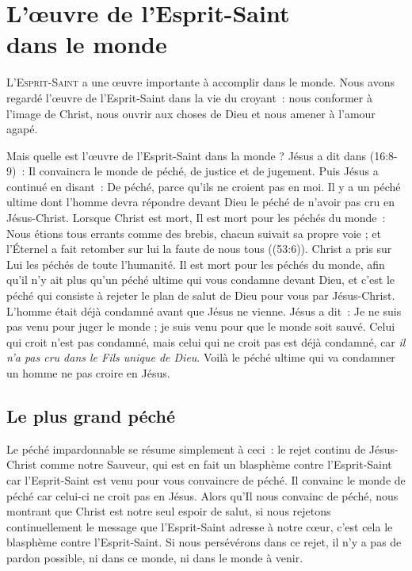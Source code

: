 \chapter[L'\oe{}uvre de l'Esprit-Saint dans le monde]{L'\oe{}uvre de l'Esprit-Saint\\ dans le monde}

\lettrine{L}{'Esprit-Saint} a une œuvre importante
 à accomplir dans le monde.
 Nous avons regardé l'œuvre de l'Esprit-Saint dans la vie du croyant~:
 nous conformer à l'image de Christ, nous ouvrir aux choses de Dieu
 et nous amener à l'amour agapé.

Mais quelle est l'œuvre de l'Esprit-Saint dans la monde ?
 Jésus a dit dans (16:8-9)~:
 \og Il convaincra le monde de péché, de justice et de jugement. \fg{}
 Puis Jésus a continué en disant~:
 \og De péché, parce qu'ils ne croient pas en moi. \fg{}
 Il y a un péché ultime dont l'homme devra répondre devant Dieu
 \ocadr le péché de n'avoir pas cru en Jésus-Christ.
 Lorsque Christ est mort, Il est mort pour les péchés du monde~:
 \og Nous étions tous errants comme des brebis,
 chacun suivait sa propre voie ;
 et l'Éternel a fait retomber sur lui la faute de nous tous \fg{}
 ((53:6)).
 Christ a pris sur Lui les péchés de toute l'humanité.
 Il est mort pour les péchés du monde, afin qu'il n'y ait plus qu'un péché
 ultime qui vous condamne devant Dieu, et c'est le péché qui consiste
 à rejeter le plan de salut de Dieu pour vous par Jésus-Christ.
 L'homme était déjà condamné avant que Jésus ne vienne.
 Jésus a dit~: \og Je ne suis pas venu pour juger le monde ;
 je suis venu pour que le monde soit sauvé.
 Celui qui croit n'est pas condamné, mais celui qui ne croit pas
 est déjà condamné, car \emph{il n'a pas cru dans le Fils
 unique de Dieu}. \fg{}
 Voilà le péché ultime qui va condamner un homme
 \ocadr ne pas croire en Jésus.


\section*{Le plus grand péché}


Le péché impardonnable se résume simplement à ceci~:
 le rejet continu de Jésus-Christ comme notre Sauveur,
 qui est en fait un blasphème contre l'Esprit-Saint
 car l'Esprit-Saint est venu pour vous convaincre de péché.
 Il \og convainc le monde de péché \fg{} car celui-ci
 ne croit pas en Jésus.
 Alors qu'Il nous convainc de péché, nous montrant que Christ
 est notre seul espoir de salut, si nous rejetons continuellement
 le message que l'Esprit-Saint adresse à notre cœur,
 c'est cela le blasphème contre l'Esprit-Saint.
 Si nous persévérons dans ce rejet, il n'y a pas de pardon possible,
 ni dans ce monde, ni dans le monde à venir.

